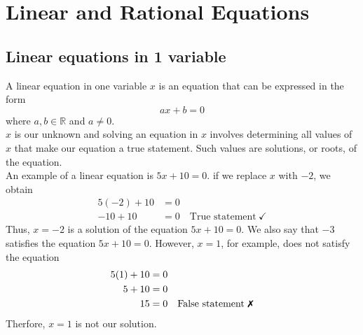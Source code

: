 \chapter{Linear and Rational Equations}
\section{Linear equations in 1 variable}
A linear equation in one variable $x$ is an equation that can be
expressed in the form 
\begin{equation}
    ax+b =0
    \label{linear_eq}
\end{equation}
where $a,b \in \mathbb{R}$ and $a\neq 0$.\\
$x$ is our unknown and solving an equation in $x$ involves determining all values of $x$ that make our equation a true statement. Such values are solutions, or roots, of the equation. \\
An example of a linear equation is $5x+10=0$. if we replace $x$ with $-2$, we obtain
\begin{align*}
        5(-2)+10 & =0\\
        -10+10 & =0\quad \text{True statement}\  \checkmark
\end{align*}
Thus, $x=-2$ is a solution of the equation $5x+10=0$. We also say that $-3$ satisfies the equation $5x+10=0$. However, $x=1$, for example, does not satisfy the equation
\begin{align*}
        5(1)+10 & =0\\
        5+10 & =0\\
        15 & =0\quad \text{False statement\ \xmark}
\end{align*}
Therfore, $x=1$ is not our solution.
